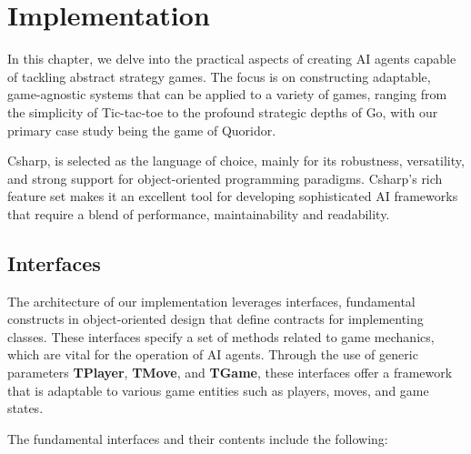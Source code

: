 \chapter{Implementation}

In this chapter, we delve into the practical aspects of creating \ac{AI} agents capable of tackling abstract strategy games. The focus is on constructing adaptable, game-agnostic systems that can be applied to a variety of games, ranging from the simplicity of Tic-tac-toe to the profound strategic depths of Go, with our primary case study being the game of Quoridor.

\ac{Csharp}, is selected as the language of choice, mainly for its robustness, versatility, and strong support for object-oriented programming paradigms. \ac{Csharp}'s rich feature set makes it an excellent tool for developing sophisticated \ac{AI} frameworks that require a blend of performance, maintainability and readability.

\section{Interfaces}

The architecture of our implementation leverages interfaces, fundamental constructs in object-oriented design that define contracts for implementing classes. These interfaces specify a set of methods related to game mechanics, which are vital for the operation of \ac{AI} agents. Through the use of generic parameters \textbf{TPlayer}, \textbf{TMove}, and \textbf{TGame}, these interfaces offer a framework that is adaptable to various game entities such as players, moves, and game states.

The fundamental interfaces and their contents include the following:

